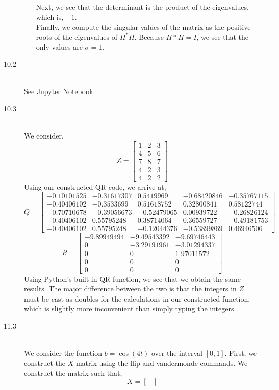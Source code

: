 \documentclass[letterpaper,10pt]{article}
\begin{document}
\begin{description}
\begin{enumerate}[label=\alph*.]
Next, we see that the determinant is the product of the eigenvalues, which is, $-1$.\\
Finally, we compute the singular values of the matrix as the positive roots of the eigenvalues of $H^*H$. Because $H*H=I$, we see that the only values are $\sigma=1$. 
\end{enumerate}
\item[10.2]\hfill \\
See Jupyter Notebook
\item[10.3]\hfill \\
We consider,
\[Z=\begin{bmatrix}
1 & 2 & 3\\4 & 5 & 6\\7 & 8 & 7\\ 4 & 2 & 3\\4 & 2 & 2
\end{bmatrix}\]
Using our constructed QR code, we arrive at,
\[Q=\begin{bmatrix}
-0.10101525 & -0.31617307  &  0.5419969   & -0.68420846  & -0.35767115\\
-0.40406102  & -0.3533699  &   0.51618752  &  0.32800841  &  0.58122744\\
-0.70710678  & -0.39056673  & -0.52479065  &  0.00939722  & -0.26826124\\
-0.40406102  &  0.55795248 &   0.38714064 &   0.36559727 &  -0.49181753\\
-0.40406102 &   0.55795248  & -0.12044376 &  -0.53899869  &  0.46946506
\end{bmatrix} \]
\[R=\begin{bmatrix}
-9.89949494 &  -9.49543392 &  -9.69746443\\
0  & -3.29191961 &  -3.01294337\\
0 & 0  &  1.97011572\\
0  &  0  &  0\\
0  &  0 &  0
\end{bmatrix} \]
Using Python's built in QR function, we see that we obtain the same results. The major difference between the two is that the integers in $Z$ must be cast as doubles for the calculations in our constructed function, which is slightly more inconvenient than simply typing the integers.
\item[11.3]\hfill\\
We consider the function $b=\cos(4t)$ over the interval $[0,1]$. First, we construct the $X$ matrix using the flip and vandermonde commands. We construct the matrix such that,
\[X=\begin{bmatrix}

\end{bmatrix}\]
\end{description}
\end{document}
